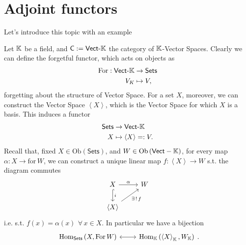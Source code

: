\section{Adjoint functors}
Let's introduce this topic with an example
\begin{ex}
	Let $\mathbb{K}$ be a field, and $\mathsf{C} := \mathsf{Vect}\text{-}\mathbb{K}$ the category of $\mathbb{K}$-Vector Spaces.
	Clearly we can define the forgetful functor, which acts on objects as
	\begin{align}
		\mathrm{For}: \mathsf{Vect}\text{-}\mathbb{K} &\to \mathsf{Sets} \\
		V_K &\mapsto V
	,\end{align} 
	forgetting about the structure of Vector Space.
	For a set $X$, moreover, we can construct the Vector Space $\left\langle X \right\rangle$,
	which is the Vector Space  for which $X$ is a basis.
	This induces a functor
	\begin{align}
		 \mathsf{Sets} &\to \mathsf{Vect}\text{-}\mathbb{K} \\
		 X&\mapsto \left\langle X \right\rangle =: V
	.\end{align} 
	Recall that, fixed $X \in \mathrm{Ob} \left(\mathsf{Sets}\right)$, and $W \in \mathrm{Ob} \left(\mathsf{Vect}-\mathbb{K}\right)$,
	for every map $\alpha: X \to \mathrm{for}\, W$, we can construct a unique linear map
	$f: \left\langle X \right\rangle \to W$ s.t. the diagram commutes
	\begin{equation}
	\begin{tikzcd}
		X \arrow[r, "\alpha", rightarrow] \arrow[d, "i", hookrightarrow] &
		W\\
		\left\langle X \right\rangle \arrow[ru, "\exists\, !\, f"', rightarrow] &
	\end{tikzcd}
	\end{equation} 
	i.e. s.t. $f(x) = \alpha(x)\ \,\forall\, x \in X$.
	In particular we have a bijection
	\begin{equation}
	\begin{tikzcd}
		\mathrm{Hom}_{\mathsf{Sets}} \left( X, \mathrm{For}\, W \right) \arrow[r, "", leftrightarrow] &
		\mathrm{Hom}_{\K} \left( \left\langle X \right\rangle_{\K}, W_{\K} \right)
	\end{tikzcd}
	.\end{equation} 
\end{ex} 

